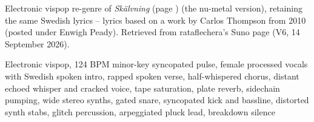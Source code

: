
\begin{notes}
Electronic vispop re-genre of \emph{Skälvning} (page \pageref{sec:skalvning}) (the nu-metal version), retaining the same Swedish lyrics -- lyrics based on a work by Carlos Thompson from 2010 (posted under Enwigh Peady). Retrieved from rataflechera's Suno page (V6, 14 September 2026).
\end{notes}
\begin{style}
Electronic vispop, 124 BPM minor-key syncopated pulse, female processed vocals with Swedish spoken intro, rapped spoken verse, half-whispered chorus, distant echoed whisper and cracked voice, tape saturation, plate reverb, sidechain pumping, wide stereo synths, gated snare, syncopated kick and bassline, distorted synth stabs, glitch percussion, arpeggiated pluck lead, breakdown silence
\end{style}
